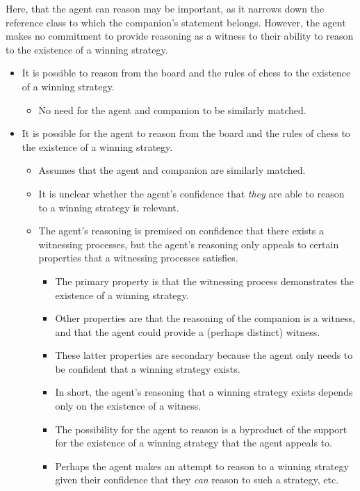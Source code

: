 \documentclass[10pt]{article}
\begin{document}
Here, that the agent can reason may be important, as it narrows down the reference class to which the companion's statement belongs.
However, the agent makes no commitment to provide reasoning as a witness to their ability to reason to the existence of a winning strategy.



\begin{itemize}
\item It is possible to reason from the board and the rules of chess to the existence of a winning strategy.
  \begin{itemize}
  \item No need for the agent and companion to be similarly matched.
  \end{itemize}
\item It is possible for the agent to reason from the board and the rules of chess to the existence of a winning strategy.
  \begin{itemize}
  \item Assumes that the agent and companion are similarly matched.
  \item It is unclear whether the agent's confidence that \emph{they} are able to reason to a winning strategy is relevant.
  \item The agent's reasoning is premised on confidence that there exists a witnessing processes, but the agent's reasoning only appeals to certain properties that a witnessing processes satisfies.
    \begin{itemize}
    \item The primary property is that the witnessing process demonstrates the existence of a winning strategy.
    \item Other properties are that the reasoning of the companion is a witness, and that the agent could provide a (perhaps distinct) witness.
    \item These latter properties are secondary because the agent only needs to be confident that a winning strategy exists.
    \item In short, the agent's reasoning that a winning strategy exists depends only on the existence of a witness.
    \item The possibility for the agent to reason is a byproduct of the support for the existence of a winning strategy that the agent appeals to.
  \item Perhaps the agent makes an attempt to reason to a winning strategy given their confidence that they \emph{can} reason to such a strategy, etc.

\end{itemize}
\end{itemize}
\end{itemize}
\end{document}
